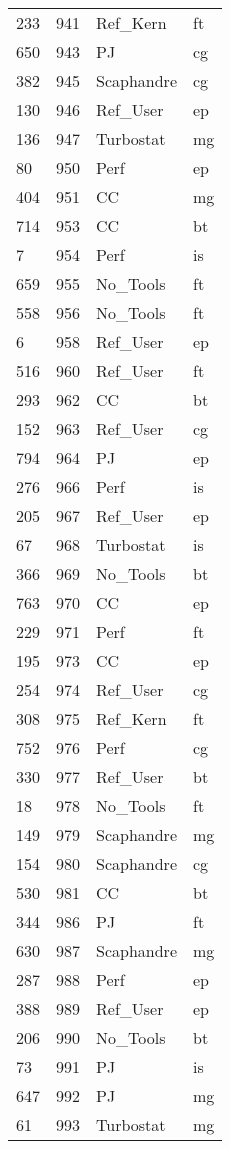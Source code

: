 \begin{tabular}{lrll}
233 & 941 & Ref_Kern & ft \\
650 & 943 & PJ & cg \\
382 & 945 & Scaphandre & cg \\
130 & 946 & Ref_User & ep \\
136 & 947 & Turbostat & mg \\
80 & 950 & Perf & ep \\
404 & 951 & CC & mg \\
714 & 953 & CC & bt \\
7 & 954 & Perf & is \\
659 & 955 & No_Tools & ft \\
558 & 956 & No_Tools & ft \\
6 & 958 & Ref_User & ep \\
516 & 960 & Ref_User & ft \\
293 & 962 & CC & bt \\
152 & 963 & Ref_User & cg \\
794 & 964 & PJ & ep \\
276 & 966 & Perf & is \\
205 & 967 & Ref_User & ep \\
67 & 968 & Turbostat & is \\
366 & 969 & No_Tools & bt \\
763 & 970 & CC & ep \\
229 & 971 & Perf & ft \\
195 & 973 & CC & ep \\
254 & 974 & Ref_User & cg \\
308 & 975 & Ref_Kern & ft \\
752 & 976 & Perf & cg \\
330 & 977 & Ref_User & bt \\
18 & 978 & No_Tools & ft \\
149 & 979 & Scaphandre & mg \\
154 & 980 & Scaphandre & cg \\
530 & 981 & CC & bt \\
344 & 986 & PJ & ft \\
630 & 987 & Scaphandre & mg \\
287 & 988 & Perf & ep \\
388 & 989 & Ref_User & ep \\
206 & 990 & No_Tools & bt \\
73 & 991 & PJ & is \\
647 & 992 & PJ & mg \\
61 & 993 & Turbostat & mg \\

\end{tabular}
